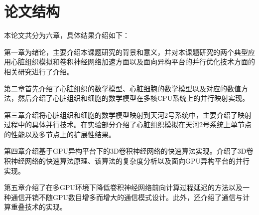 \section{论文结构}
本论文共分为六章，具体结果介绍如下：

第一章为绪论，主要介绍本课题研究的背景和意义，并对本课题研究的两个典型应用\pozhehao 心脏组织模拟和卷积神经网络加速方面以及面向异构平台的并行优化技术方面的相关研究进行了介绍。

第二章首先介绍了心脏组织的数学模型、心脏细胞的数学模型以及对应的数值方法，然后介绍了心脏组织和细胞的数学模型在多核CPU系统上的并行映射实现。

第三章介绍将心脏组织和细胞的数学模型映射到天河2号系统中，主要介绍了映射过程中的具体并行技术。在实验部分介绍了心脏组织模拟在天河2号系统上单节点的性能以及多节点上的扩展性结果。

第四章介绍基于GPU异构平台下的3D卷积神经网络的快速算法实现。介绍了3D卷积神经网络的快速算法原理、该算法的复杂度分析以及面向GPU异构平台的并行实现。

第五章介绍了在多GPU环境下降低卷积神经网络前向计算过程延迟的方法以及一种通信开销不随GPU数目增多而增大的通信模式设计。此外，还介绍了通信与计算重叠技术的实现。





